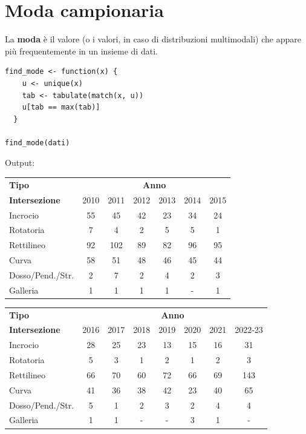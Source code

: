 \documentclass[14pt, openany, titlepage]{report} %
\begin{document}
\section{Moda campionaria}
La \textbf{moda} è il valore (o i valori, in caso di distribuzioni multimodali)
 che appare più frequentemente in un insieme di dati.
\begin{center}
\begin{lstlisting}[breaklines=true]
find_mode <- function(x) {
    u <- unique(x)
    tab <- tabulate(match(x, u))
    u[tab == max(tab)]
  }

find_mode(dati)
\end{lstlisting}  
\end{center}
\noindent
Output: 
\begin{table}[!ht]
\centering
\footnotesize
\centering
\begin{tabular}{|l|c|c|c|c|c|c|}
\hline
\textbf{Tipo} & \multicolumn{6}{c|}{\textbf{Anno}} \\ \cline{2-7}
\textbf{Intersezione} & 2010 & 2011 & 2012 & 2013 & 2014 & 2015 \\ \hline
Incrocio & 55 & 45 & 42 & 23 & 34 & 24 \\ \hline
Rotatoria & 7 & 4 & 2 & 5 & 5 & 1 \\ \hline
Rettilineo & 92 & 102 & 89 & 82 & 96 & 95 \\ \hline
Curva & 58 & 51 & 48 & 46 & 45 & 44 \\ \hline
Dosso/Pend./Str. & 2 & 7 & 2 & 4 & 2 & 3 \\ \hline
Galleria & 1 & 1 & 1 & 1 & - & 1 \\ \hline
\end{tabular}

\vspace{0.5cm}

\begin{tabular}{|l|c|c|c|c|c|c|c|}
\hline
\textbf{Tipo} & \multicolumn{7}{c|}{\textbf{Anno}} \\ \cline{2-8}
\textbf{Intersezione} & 2016 & 2017 & 2018 & 2019 & 2020 & 2021 & 2022-23 \\ \hline
Incrocio & 28 & 25 & 23 & 13 & 15 & 16 & 31 \\ \hline
Rotatoria & 5 & 3 & 1 & 2 & 1 & 2 & 3 \\ \hline
Rettilineo & 66 & 70 & 60 & 72 & 66 & 69 & 143 \\ \hline
Curva & 41 & 36 & 38 & 42 & 23 & 40 & 65 \\ \hline
Dosso/Pend./Str. & 5 & 1 & 2 & 3 & 2 & 4 & 4 \\ \hline
Galleria & 1 & 1 & - & - & 3 & 1 & - \\ \hline
\end{tabular}
\end{table}
\normalsize
\end{document}
